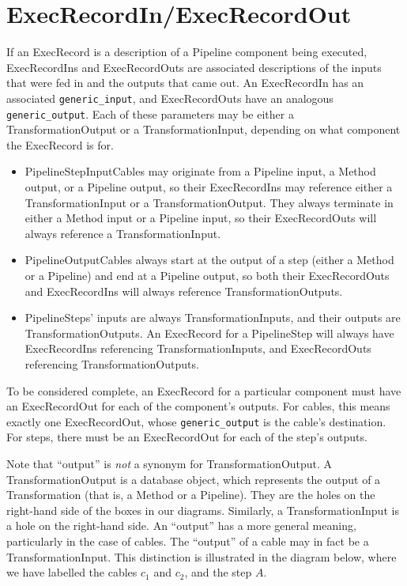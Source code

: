 \documentclass[12pt]{article}
\newcommand{\code}[1]{\texttt{#1}}
\begin{document}
\section*{ExecRecordIn/ExecRecordOut}

If an ExecRecord is a description of a Pipeline component being executed,
ExecRecordIns and ExecRecordOuts are associated descriptions of the inputs that
were fed in and the outputs that came out. An ExecRecordIn has an associated
\code{generic\_input}, and ExecRecordOuts have an analogous
\code{generic\_output}. Each of these parameters may be either a
TransformationOutput or a TransformationInput, depending on what component the
ExecRecord is for. 

\begin{itemize}
  \item PipelineStepInputCables may originate from a Pipeline input, a Method
    output, or a Pipeline output, so their ExecRecordIns may reference either a
    TransformationInput or a TransformationOutput. They always terminate in
    either a Method input or a Pipeline input, so their ExecRecordOuts will
    always reference a TransformationInput. 
  \item PipelineOutputCables always start at the output of a step (either a
    Method or a Pipeline) and end at a Pipeline output, so both their
    ExecRecordOuts and ExecRecordIns will always reference
    TransformationOutputs.
  \item PipelineSteps' inputs are always TransformationInputs, and their
    outputs are TransformationOutputs. An ExecRecord for a PipelineStep will
    always have ExecRecordIns referencing TransformationInputs, and
    ExecRecordOuts referencing TransformationOutputs.
\end{itemize}

To be considered complete, an ExecRecord for a particular component must have
an ExecRecordOut for each of the component's outputs. For cables, this means
exactly one ExecRecordOut, whose \code{generic\_output} is the cable's
destination. For steps, there must be an ExecRecordOut for each of the step's
outputs.

Note that ``output'' is \emph{not} a synonym for TransformationOutput. A
TransformationOutput is a database object, which represents the output of a
Transformation (that is, a Method or a Pipeline). They are the holes on the
right-hand side of the boxes in our diagrams. Similarly, a TransformationInput
is a hole on the right-hand side. An ``output'' has a more general meaning,
particularly in the case of cables. The ``output'' of a cable may in fact be a
TransformationInput. This distinction is illustrated in the diagram below,
where we have labelled the cables $c_1$ and $c_2$, and the step $A$.
\end{document}
